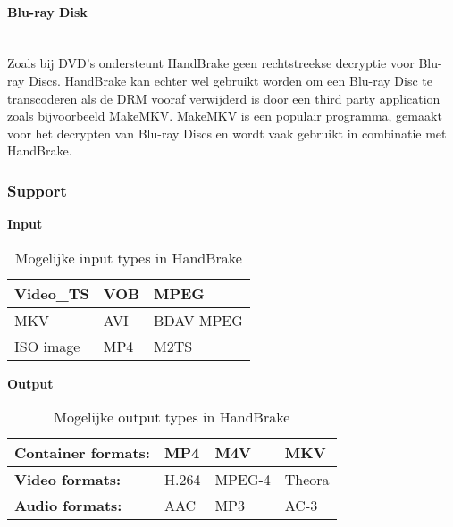 \paragraph{Blu-ray Disk}  
\ \\[6pt]

Zoals bij DVD's ondersteunt HandBrake geen rechtstreekse decryptie voor Blu-ray Discs. HandBrake kan echter wel gebruikt worden om een Blu-ray Disc te transcoderen als de DRM vooraf verwijderd is door een third party application zoals bijvoorbeeld MakeMKV. MakeMKV is een populair programma, gemaakt voor het decrypten van Blu-ray Discs en wordt vaak gebruikt in combinatie met HandBrake.

\subsubsection{Support}

\begin{table}[!h]
\textbf{Input}\\
\centering
\begin{tabular}{ | l | l | l | }
\hline
Video\_TS & VOB & MPEG \\ \hline
MKV & AVI & BDAV MPEG\-2 \\ \hline
ISO image & MP4 & M2TS \\
\hline
\end{tabular}
\caption{Mogelijke input types in HandBrake}
\label{tab:input}
\end{table}

\begin{table}[!h]
\textbf{Output}\\
\centering
\begin{tabular}{ | l | l | l | l | }
\hline
\textbf{Container formats:} & MP4 & M4V & MKV \\ \hline
\textbf{Video formats:} & H.264 & MPEG-4 & Theora \\ \hline
\textbf{Audio formats:} & AAC & MP3 & AC-3 \\
\hline
\end{tabular}
\caption{Mogelijke output types in HandBrake}
\label{tab:output}
\end{table}

\pagebreak